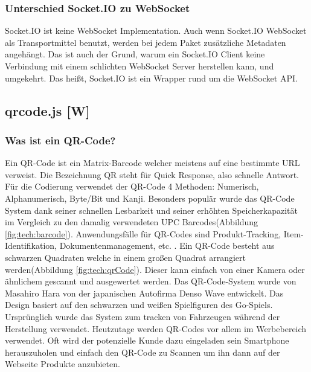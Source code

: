 \subsubsection{Unterschied Socket.IO zu WebSocket}
Socket.IO ist keine WebSocket Implementation. Auch wenn Socket.IO WebSocket als Transportmittel benutzt, werden bei jedem Paket zusätzliche Metadaten angehängt. Das ist auch der Grund, warum
ein Socket.IO Client keine Verbindung mit einem schlichten WebSocket Server herstellen kann, und umgekehrt.
Das heißt, Socket.IO ist ein Wrapper rund um die WebSocket API. \cite{socketio}


\subsection{qrcode.js [W]}

\subsubsection{Was ist ein QR-Code?}
Ein QR-Code ist ein Matrix-Barcode welcher meistens auf eine bestimmte URL verweist. Die Bezeichnung QR steht für Quick Response,
also schnelle Antwort. Für die Codierung verwendet der QR-Code 4 Methoden: Numerisch, Alphanumerisch, Byte/Bit und Kanji.
Besonders populär wurde das QR-Code System dank seiner
schnellen Lesbarkeit und seiner erhöhten Speicherkapazität im Vergleich zu den
damalig verwendeten UPC Barcodes(Abbildung \ref{fig:tech:barcode}). Anwendungsfälle für QR-Codes sind Produkt-Tracking, Item-Identifikation, Dokumentenmanagement, etc. .
Ein QR-Code besteht aus schwarzen Quadraten welche in einem großen Quadrat arrangiert werden(Abbildung \ref{fig:tech:qrCode}).
Dieser kann einfach von einer Kamera oder ähnlichem gescannt und ausgewertet werden.
Das QR-Code-System wurde von Masahiro Hara von der japanischen Autofirma Denso Wave entwickelt.
Das Design basiert auf den schwarzen und weißen Spielfiguren des Go-Spiels.
Ursprünglich wurde das System zum tracken von Fahrzeugen während der Herstellung verwendet.
Heutzutage werden QR-Codes vor allem im Werbebereich verwendet. Oft wird der
potenzielle Kunde dazu eingeladen  sein Smartphone herauszuholen und einfach den QR-Code zu Scannen um
ihn dann auf der Webseite Produkte anzubieten.%

